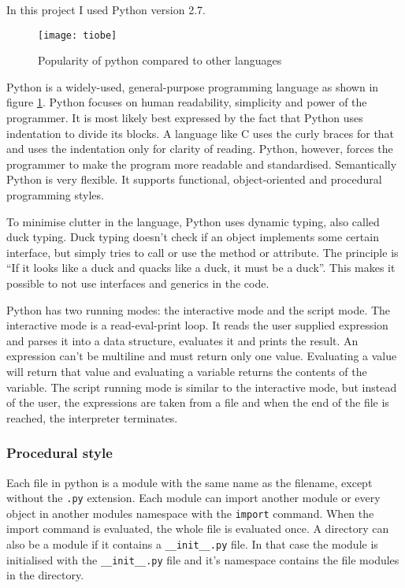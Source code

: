 In this project I used Python version 2.7.

\begin{figure}[htp]
\begin{center}
  \texttt{[image: tiobe]}
  \caption[Python popularity]{Popularity of python compared to other
  languages\cite{website:tiobe-index}}
  \label{python-popularity}
\end{center}
\end{figure}

Python is a widely-used, general-purpose programming language as shown in
figure \ref{python-popularity}.
Python focuses on human readability, simplicity and power of the programmer. It is most likely
best expressed by the fact that Python uses indentation to divide its blocks. A
language like C uses the curly braces for that and uses the indentation only for
clarity of reading. Python, however, forces the programmer to make the program
more readable and standardised. Semantically Python is very flexible. It
supports functional, object-oriented and procedural programming styles.

To minimise clutter in the language, Python uses dynamic typing, also called
duck typing. Duck typing doesn't check if an object implements some certain
interface, but simply tries to call or use the method or attribute. The
principle is ``If it looks like a duck and quacks like a duck, it must be a
duck''.\cite[duck-typing]{python-glossary} This makes it possible to not use
interfaces and generics in the code.

Python has two running modes: the interactive mode and the script mode. The
interactive mode is a read-eval-print loop. It reads the user supplied
expression and parses it into a data structure, evaluates it and prints the
result. An expression can't be multiline and must return only one value.
Evaluating a value will return that value and evaluating a variable returns the
contents of the variable. The script running mode is similar to the interactive
mode, but instead of the user, the expressions are taken from a file and when
the end of the file is reached, the interpreter terminates.

\subsubsection{Procedural style}
Each file in python is a module with the same name as the filename, except without the \texttt{.py} extension. Each module can import another module or every object in another modules namespace with the \texttt{import} command. When the import command is evaluated, the whole file is evaluated once. A directory can also be a module if it contains a \texttt{\_\_init\_\_.py} file. In that case the module is initialised with the \texttt{\_\_init\_\_.py} file and it's namespace contains the file modules in the directory.

